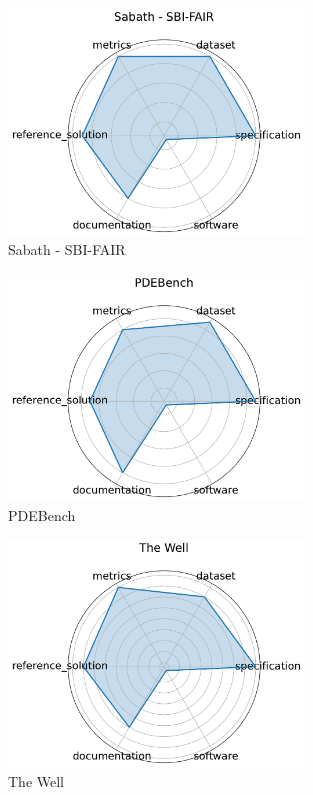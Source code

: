 \documentclass{article}
\begin{document}
\begin{figure}[h!]
  \centering
  \includegraphics[width=0.7\textwidth]{Sabath - SBI-FAIR_radar.pdf}
  \caption{Sabath - SBI-FAIR \cite{luszczek2021sabath}}
\end{figure}

\begin{figure}[h!]
  \centering
  \includegraphics[width=0.7\textwidth]{PDEBench_radar.pdf}
  \caption{PDEBench \cite{takamoto2024pdebenchextensivebenchmarkscientific}}
\end{figure}

\begin{figure}[h!]
  \centering
  \includegraphics[width=0.7\textwidth]{The Well_radar.pdf}
  \caption{The Well \cite{ohana2024well}}
\end{figure}
\end{document}
